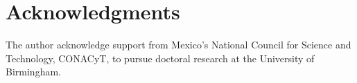 \documentclass{sigchi}
\begin{document}

\section{Acknowledgments}
The author acknowledge support from Mexico's National Council 
for Science and Technology, CONACyT, to pursue doctoral research at the 
University of Birmingham.

%
%
%




% 
\end{document}
